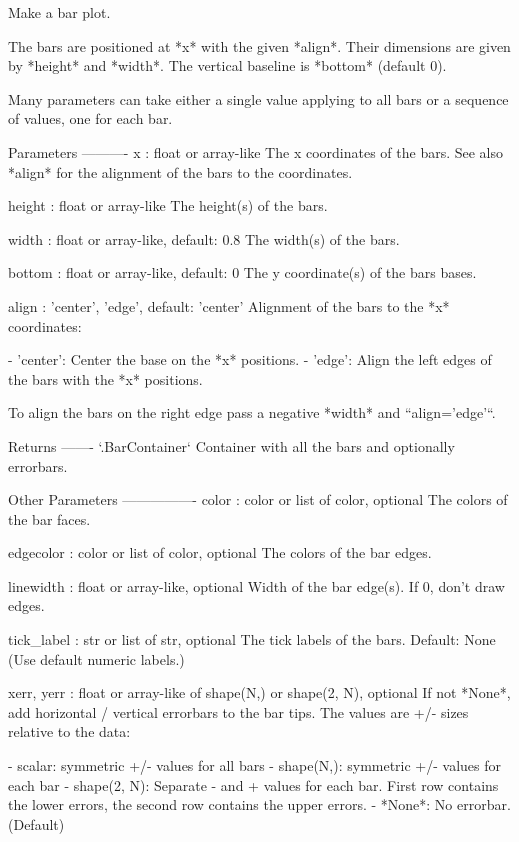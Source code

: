 \begin{DoxyVerb}Make a bar plot.

The bars are positioned at *x* with the given *align*\ment. Their
dimensions are given by *height* and *width*. The vertical baseline
is *bottom* (default 0).

Many parameters can take either a single value applying to all bars
or a sequence of values, one for each bar.

Parameters
----------
x : float or array-like
    The x coordinates of the bars. See also *align* for the
    alignment of the bars to the coordinates.

height : float or array-like
    The height(s) of the bars.

width : float or array-like, default: 0.8
    The width(s) of the bars.

bottom : float or array-like, default: 0
    The y coordinate(s) of the bars bases.

align : {'center', 'edge'}, default: 'center'
    Alignment of the bars to the *x* coordinates:

    - 'center': Center the base on the *x* positions.
    - 'edge': Align the left edges of the bars with the *x* positions.

    To align the bars on the right edge pass a negative *width* and
    ``align='edge'``.

Returns
-------
`.BarContainer`
    Container with all the bars and optionally errorbars.

Other Parameters
----------------
color : color or list of color, optional
    The colors of the bar faces.

edgecolor : color or list of color, optional
    The colors of the bar edges.

linewidth : float or array-like, optional
    Width of the bar edge(s). If 0, don't draw edges.

tick_label : str or list of str, optional
    The tick labels of the bars.
    Default: None (Use default numeric labels.)

xerr, yerr : float or array-like of shape(N,) or shape(2, N), optional
    If not *None*, add horizontal / vertical errorbars to the bar tips.
    The values are +/- sizes relative to the data:

    - scalar: symmetric +/- values for all bars
    - shape(N,): symmetric +/- values for each bar
    - shape(2, N): Separate - and + values for each bar. First row
      contains the lower errors, the second row contains the upper
      errors.
    - *None*: No errorbar. (Default)


\end{DoxyVerb}
